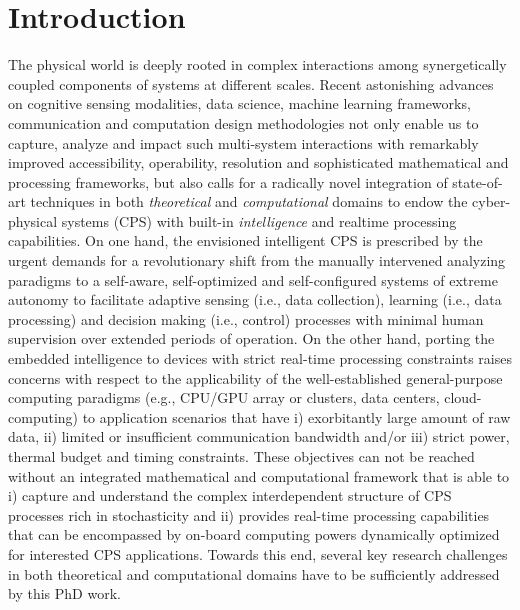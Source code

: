 \chapter{Introduction}
\label{cha:introduction}

The physical world is deeply rooted in complex interactions among synergetically coupled components of systems at different scales. Recent astonishing advances on cognitive sensing modalities, data science, machine learning frameworks, communication and computation design methodologies not only enable us to capture, analyze and impact such multi-system interactions with remarkably improved accessibility, operability, resolution and sophisticated mathematical and processing frameworks, but also calls for a radically novel integration of state-of-art techniques in both \textit{theoretical} and \textit{computational} domains to endow the cyber-physical systems (CPS) with built-in \textit{intelligence} and realtime processing capabilities. On one hand, the envisioned intelligent CPS is prescribed by the urgent demands for a revolutionary shift from the manually intervened analyzing paradigms to a self-aware, self-optimized and self-configured systems of extreme autonomy to facilitate adaptive sensing (i.e., data collection), learning (i.e., data processing) and decision making (i.e., control) processes with minimal human supervision over extended periods of operation. On the other hand, porting the embedded intelligence to devices with strict real-time processing constraints raises concerns with respect to the applicability of the well-established general-purpose computing paradigms (e.g., CPU/GPU array or clusters, data centers, cloud-computing) to application scenarios that have i) exorbitantly large amount of raw data, ii) limited  or insufficient communication bandwidth and/or iii) strict power,  thermal budget and timing constraints. These objectives can not be reached without an integrated mathematical and computational framework that is able to  i) capture and understand the complex interdependent structure of CPS processes rich in stochasticity and ii) provides real-time processing capabilities that can be encompassed by on-board computing powers dynamically optimized for interested CPS applications. Towards this end, several key research challenges in both theoretical and computational domains have to be sufficiently addressed by this PhD work.

